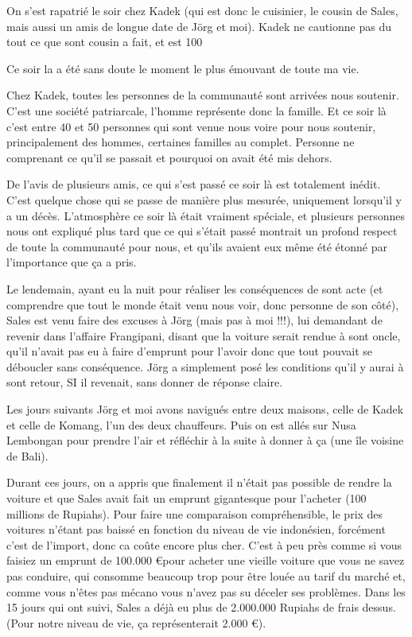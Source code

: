 \par
On s’est rapatrié le soir chez Kadek (qui est donc le cuisinier, le cousin de Sales, mais aussi un amis de longue date de Jörg et moi). Kadek ne cautionne pas du tout ce que sont cousin a fait, et est 100%

\par
Ce soir la a été sans doute le moment le plus émouvant de toute ma vie.

\par
Chez Kadek, toutes les personnes de la communauté sont arrivées nous soutenir. C’est une société patriarcale, l’homme représente donc la famille. Et ce soir là c’est entre 40 et 50 personnes qui sont venue nous voire pour nous soutenir, principalement des hommes, certaines familles au complet. Personne ne comprenant ce qu’il se passait et pourquoi on avait été mis dehors.

\par
De l’avis de plusieurs amis, ce qui s’est passé ce soir là est totalement inédit. C’est quelque chose qui se passe de manière plus mesurée, uniquement lorsqu’il y a un décès. L’atmosphère ce soir là était vraiment spéciale, et plusieurs personnes nous ont expliqué plus tard que ce qui s’était passé montrait un profond respect de toute la communauté pour nous, et qu’ils avaient eux même été étonné par l’importance que ça a pris.

\par
Le lendemain, ayant eu la nuit pour réaliser les conséquences de sont acte (et comprendre que tout le monde était venu nous voir, donc personne de son côté), Sales est venu faire des excuses à Jörg (mais pas à moi !!!), lui demandant de revenir dans l’affaire Frangipani, disant que la voiture serait rendue à sont oncle, qu’il n’avait pas eu à faire d’emprunt pour l’avoir donc que tout pouvait se déboucler sans conséquence. Jörg a simplement posé les conditions qu’il y aurai à sont retour, SI il revenait, sans donner de réponse claire.

\par
Les jours suivants Jörg et moi avons navigués entre deux maisons, celle de Kadek et celle de Komang, l’un des deux chauffeurs. Puis on est allés sur Nusa Lembongan pour prendre l’air et réfléchir à la suite à donner à ça (une île voisine de Bali).

\par
Durant ces jours, on a appris que finalement il n’était pas possible de rendre la voiture et que Sales avait fait un emprunt gigantesque pour l’acheter (100 millions de Rupiahs). Pour faire une comparaison compréhensible, le prix des voitures n’étant pas baissé en fonction du niveau de vie indonésien, forcément c’est de l’import, donc ca coûte encore plus cher. C’est à peu près comme si vous faisiez un emprunt de 100.000 \euro pour acheter une vieille voiture que vous ne savez pas conduire, qui consomme beaucoup trop pour être louée au tarif du marché et, comme vous n’êtes pas mécano vous n’avez pas su déceler ses problèmes. Dans les 15 jours qui ont suivi, Sales a déjà eu plus de 2.000.000 Rupiahs de frais dessus. (Pour notre niveau de vie, ça représenterait 2.000 \euro).

